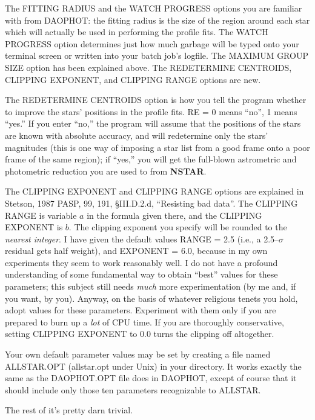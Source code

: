 The FITTING RADIUS and the WATCH PROGRESS options you are familiar with
from DAOPHOT:  the fitting radius is the size of the region around each
star which will actually be used in performing the profile fits.  The
WATCH PROGRESS option determines just how much garbage will be typed
onto your terminal screen or written into your batch job's logfile.  The
MAXIMUM GROUP SIZE option has been explained above.  The REDETERMINE 
CENTROIDS, CLIPPING EXPONENT, and CLIPPING RANGE options are new.

The REDETERMINE CENTROIDS option is how you tell the program whether
to improve the stars' positions in the profile fits.  RE = 0 means
``no'', 1 means ``yes.''  If you enter ``no,'' the program will
assume that the positions of the stars are known with absolute
accuracy, and will redetermine only the stars' magnitudes (this is
one way of imposing a star list from a good frame onto a poor frame
of the same region); if ``yes,'' you will get the full-blown 
astrometric and photometric reduction you are used to from {\bf NSTAR}.

The CLIPPING EXPONENT and CLIPPING RANGE options are explained in
Stetson, 1987 PASP, 99, 191, \S III.D.2.d, ``Resisting bad data''.  The
CLIPPING RANGE is variable $a$ in the formula given there, and the
CLIPPING EXPONENT is $b$.  The clipping exponent you specify will be
rounded to the {\it nearest integer\/}.  I have given the default
values RANGE = 2.5 (i.e., a 2.5--$\sigma$ residual gets half weight),
and EXPONENT = 6.0, because in my own experiments they seem to work
reasonably well. I do not have a profound understanding of some
fundamental way to obtain ``best'' values for these parameters; this
subject still needs {\it much\/} more experimentation (by me and, if
you want, by you).  Anyway, on the basis of whatever religious tenets
you hold, adopt values for these parameters. Experiment with them only
if you are prepared to burn up a {\it lot\/} of CPU time.  If you are
thoroughly conservative, setting CLIPPING EXPONENT to 0.0 turns the
clipping off altogether.

Your own default parameter values may be set by creating a file named
ALLSTAR.OPT (allstar.opt under Unix) in your directory.  It works
exactly the same as the DAOPHOT.OPT file does in DAOPHOT, except of
course that it should include only those ten parameters recognizable to
ALLSTAR.

\vfill
\eject
The rest of it's pretty darn trivial.

